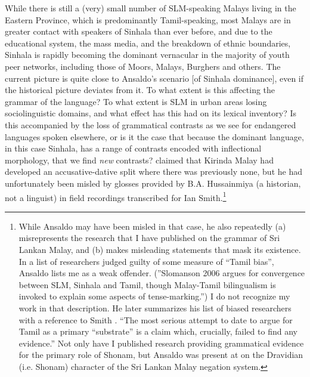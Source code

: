 While there is still a (very) small number of SLM-speaking Malays living in the Eastern Province, which is predominantly Tamil-speaking, most Malays are in greater contact with speakers of Sinhala than ever before, and due to the educational system, the mass media, and the breakdown of ethnic boundaries, Sinhala is rapidly becoming the dominant vernacular in the majority of youth peer networks, including those of Moors, Malays, Burghers and others. The current picture is quite close to Ansaldo's scenario [of Sinhala dominance], even if the historical picture deviates from it. To what extent is this affecting the grammar of the language? To what extent is SLM in urban areas losing sociolinguistic domains, and what effect has this had on its lexical inventory? Is this accompanied by the loss of grammatical contrasts as we see for endangered languages spoken elsewhere, or is it the case that because the dominant language, in this case Sinhala, has a range of contrasts encoded with inflectional morphology, that we find \textit{new} contrasts? \citet{Ansaldo2005ms} claimed that Kirinda Malay had developed an accusative-dative split where there was previously none, but he had unfortunately been misled by glosses provided by B.A. Hussainmiya (a historian, not a linguist) in field recordings transcribed for Ian Smith.\footnote{While
  Ansaldo may have been misled in that case, he also repeatedly (a) misrepresents the research that I have published on the grammar of Sri Lankan Malay, and (b) makes misleading statements that mask its existence. In a list of researchers judged guilty of some measure of ``Tamil bias'', Ansaldo \citet[377-378]{Ansaldo2011a} lists me as a weak offender. (''Slomanson 2006 argues for convergence between SLM, Sinhala and Tamil, though Malay-Tamil bilingualism is invoked to explain some aspects of tense-marking.'') I do not recognize my work in that description. He later summarizes his list of biased researchers with a reference to Smith \citet{Smith2003timing}. ``The most serious attempt to date to argue for Tamil as a primary ``substrate'' \citep[i.e.][]{Smith2003timing} is a claim which, crucially, failed to find any evidence.'' Not only have I published research providing grammatical evidence for the primary role of Shonam, but Ansaldo was present at \citet{Slomanson2007} on the Dravidian (i.e. Shonam) character of the Sri Lankan Malay negation system.
} 
